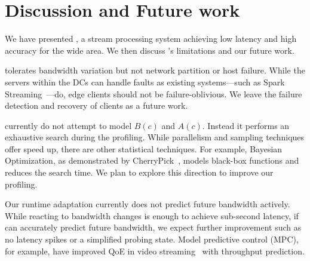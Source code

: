 \section{Discussion and Future work}
\label{sec:discussion}

We have presented \sysname{}, a stream processing system achieving low latency
and high accuracy for the wide area. We then discuss \sysname{}'s limitations
and our future work.

 \sysname{} tolerates bandwidth
variation but not network partition or host failure. While the servers within
the DCs can handle faults as existing systems---such as Spark
Streaming~\cite{zaharia2013discretized}---do, edge clients should not be
failure-oblivious. We leave the failure detection and recovery of clients as a
future work.

 \sysname{} currently do not attempt to model $B(c)$
and $A(c)$. Instead it performs an exhaustive search during the profiling. While
parallelism and sampling techniques offer speed up, there are other statistical
techniques. For example, Bayesian Optimization, as demonstrated by
CherryPick~\cite{alipourfard2017cherrypick}, models black-box functions and
reduces the search time. We plan to explore this direction to improve our
profiling.


 Our runtime adaptation currently does not
predict future bandwidth actively. While reacting to bandwidth changes is enough
to achieve sub-second latency, if \sysname{} can accurately predict future
bandwidth, we expect further improvement such as no latency spikes or a
simplified probing state. Model predictive control (MPC), for example, have
improved QoE in video streaming~\cite{yin2015control} with throughput
prediction.


